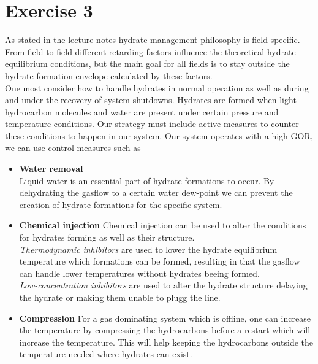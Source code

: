 \documentclass[a4paper,norsk]{article}
\begin{document}
\section*{Exercise 3}
As stated in the lecture notes hydrate management philosophy is field specific. From field to field different retarding factors influence the theoretical hydrate equilibrium conditions, but the main goal for all fields is to stay outside the hydrate formation envelope calculated by these factors. \\
One most consider how to handle hydrates in normal operation as well as during and under the recovery of system shutdowns. Hydrates are formed when light hydrocarbon molecules and water are present under certain pressure and temperature conditions. Our strategy must include active measures to counter these conditions to happen in our system.  
Our system operates with a high GOR, we can use control measures such as 
\begin{itemize}
\item \textbf{Water removal} \\
Liquid water is an essential part of hydrate formations to occur. By dehydrating the gasflow to a certain water dew-point we can prevent the creation of hydrate formations for the specific system.

\item \textbf{Chemical injection}
Chemical injection can be used to alter the conditions for hydrates forming as well as their structure. \\
\textit{Thermodynamic inhibitors} are used to lower the hydrate equilibrium temperature which formations can be formed, resulting in that the gasflow can handle lower temperatures without hydrates beeing formed. \\
\textit{Low-concentration inhibitors} are used to alter the hydrate structure delaying the hydrate or making them unable to plugg the line.

\item \textbf{Compression}
For a gas dominating system which is offline, one can increase the temperature by compressing the hydrocarbons before a restart which will increase the temperature. This will help keeping the hydrocarbons outside the temperature needed where hydrates can exist. 
\end{itemize}

\newpage
\end{document}
